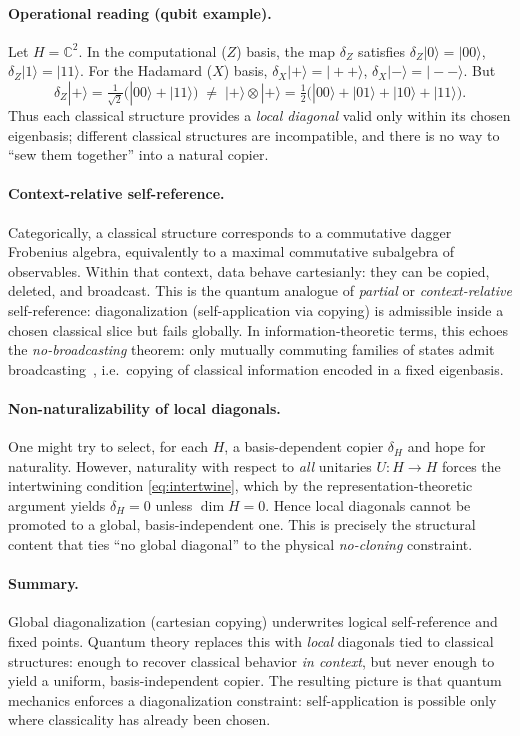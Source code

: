 \documentclass[11pt]{article}
\theoremstyle{upright}
\begin{document}
\paragraph{Operational reading (qubit example).}
Let $H=\mathbb{C}^2$. In the computational ($Z$) basis, the map $\delta_Z$ satisfies $\delta_Z|0\rangle=|00\rangle$, $\delta_Z|1\rangle=|11\rangle$. For the Hadamard ($X$) basis, $\delta_X|+\rangle=|++\rangle$, $\delta_X|-\rangle=|--\rangle$. But
\[
\delta_Z|+\rangle
= \tfrac{1}{\sqrt{2}}\big(|00\rangle+|11\rangle\big)
\;\neq\; |+\rangle\otimes|+\rangle
= \tfrac{1}{2}\big(|00\rangle+|01\rangle+|10\rangle+|11\rangle\big).
\]
Thus each classical structure provides a \emph{local diagonal} valid only within its chosen eigenbasis; different classical structures are incompatible, and there is no way to ``sew them together'' into a natural copier.

\paragraph{Context-relative self-reference.}
Categorically, a classical structure corresponds to a commutative dagger Frobenius algebra, equivalently to a maximal commutative subalgebra of observables. Within that context, data behave cartesianly: they can be copied, deleted, and broadcast. This is the quantum analogue of \emph{partial} or \emph{context-relative} self-reference: diagonalization (self-application via copying) is admissible inside a chosen classical slice but fails globally. In information-theoretic terms, this echoes the \emph{no-broadcasting} theorem: only mutually commuting families of states admit broadcasting~\cite{BarnumEtAl1996}, i.e.\ copying of classical information encoded in a fixed eigenbasis.

\paragraph{Non-naturalizability of local diagonals.}
One might try to select, for each $H$, a basis-dependent copier $\delta_H$ and hope for naturality. However, naturality with respect to \emph{all} unitaries $U:H\to H$ forces the intertwining condition \eqref{eq:intertwine}, which by the representation-theoretic argument yields $\delta_H=0$ unless $\dim H=0$. Hence local diagonals cannot be promoted to a global, basis-independent one. This is precisely the structural content that ties ``no global diagonal'' to the physical \emph{no-cloning} constraint.

\paragraph{Summary.}
Global diagonalization (cartesian copying) underwrites logical self-reference and fixed points. Quantum theory replaces this with \emph{local} diagonals tied to classical structures: enough to recover classical behavior \emph{in context}, but never enough to yield a uniform, basis-independent copier. The resulting picture is that quantum mechanics enforces a diagonalization constraint: self-application is possible only where classicality has already been chosen.
\end{document}
